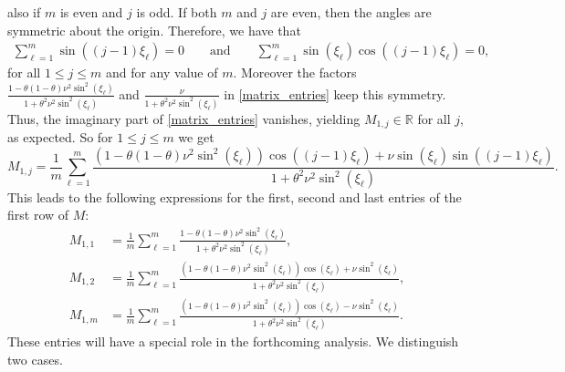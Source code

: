 \documentclass[a4paper]{article}
\begin{document}
also if $m$ is even and $j$ is odd.
If both $m$ and $j$ are even, then the angles are symmetric about the origin.
Therefore, we have that
\begin{align*}
	\sum_{\ell=1}^{m} \sin((j-1)\xi_\ell) = 0 \qquad \text{and} \qquad
		\sum_{\ell=1}^{m} \sin(\xi_\ell)\cos((j-1)\xi_\ell) = 0,
\end{align*}
for all $1\le j\le m$  and for any value of $m$.
Moreover the factors
$\frac{1-\theta(1-\theta)\nu^2\sin^2(\xi_\ell)}{1+\theta^2\nu^2 \sin^2(\xi_\ell)}$
and $\frac{\nu}{1+\theta^2\nu^2 \sin^2(\xi_\ell)}$ in \eqref{matrix_entries} keep this symmetry.
Thus, the imaginary part of \eqref{matrix_entries} vanishes, yielding $M_{1,j}\in\mathbb{R}$ for all $j$,
as expected.
So for $1\le j\le m$ we get
\[
  M_{1,j}  = \frac{1}{m} \sum_{\ell=1}^{m} \frac{\left(1-\theta(1-\theta)\nu^2\sin^2(\xi_\ell)\right)
  \cos((j-1)\xi_\ell) + \nu \sin(\xi_\ell)\sin((j-1)\xi_\ell)}{1+\theta^2\nu^2 \sin^2(\xi_\ell)}.
\]
This leads to the following expressions for the first, second and last entries of the first
row of $M$:
\begin{align*}
	M_{1,1} & = \frac{1}{m} \sum_{\ell=1}^m \frac{1-\theta(1-\theta)\nu^2\sin^2(\xi_\ell)}
		{1+\theta^2\nu^2\sin^2(\xi_\ell)}, \\
	M_{1,2} & = \frac{1}{m} \sum_{\ell=1}^{m} \frac{\left(1-\theta(1-\theta)\nu^2\sin^2(\xi_\ell)\right)
		\cos(\xi_\ell) + \nu \sin^2(\xi_\ell)}{1+\theta^2\nu^2 \sin^2(\xi_\ell)}, \\
	M_{1,m} & = \frac{1}{m} \sum_{\ell=1}^m \frac{\left(1-\theta(1-\theta)\nu^2\sin^2(\xi_\ell)\right)
		\cos(\xi_\ell) - \nu \sin^2 (\xi_\ell)}{1+\theta^2\nu^2 \sin^2 (\xi_\ell)}.
\end{align*}
These entries will have a special role in the forthcoming analysis. 
We distinguish two cases.
\end{document}
